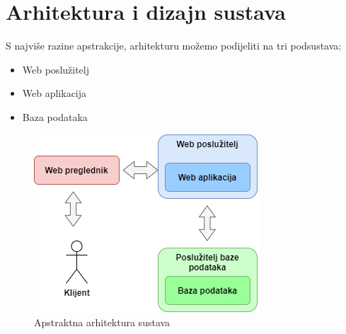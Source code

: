 \chapter{Arhitektura i dizajn sustava}
		

	S najviše razine apstrakcije, arhitekturu možemo podijeliti na tri podsustava:
	\begin{itemize}
		\item Web poslužitelj
		\item Web aplikacija
		\item Baza podataka
	\end{itemize}

\vspace{15pt} 
\begin{figure}[H]
	\includegraphics[scale=0.75]{slike/apstraktna-arh.PNG} %
	\centering
	\caption{Apstraktna arhitektura sustava}
	\label{fig:arh}
\end{figure}
\vspace{15pt}

